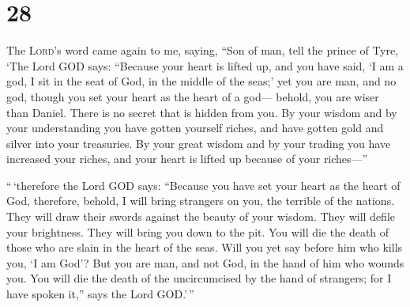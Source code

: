 \hypertarget{section-27}{%
\section{28}\label{section-27}}

 The \textsc{Lord}'s word came again to me, saying,
 ``Son of man, tell the prince of Tyre, `The Lord GOD
says: ``Because your heart is lifted up, and you have said, `I am a god,
I sit in the seat of God, in the middle of the seas;' yet you are man,
and no god, though you set your heart as the heart of a god---
 behold, you are wiser than Daniel. There is no secret
that is hidden from you.  By your wisdom and by your
understanding you have gotten yourself riches, and have gotten gold and
silver into your treasuries.  By your great wisdom and by
your trading you have increased your riches, and your heart is lifted up
because of your riches---''

 ``\,`therefore the Lord GOD says: ``Because you have set
your heart as the heart of God,  therefore, behold, I will
bring strangers on you, the terrible of the nations. They will draw
their swords against the beauty of your wisdom. They will defile your
brightness.  They will bring you down to the pit. You will
die the death of those who are slain in the heart of the seas.
 Will you yet say before him who kills you, `I am God'?
But you are man, and not God, in the hand of him who wounds you.
 You will die the death of the uncircumcised by the hand
of strangers; for I have spoken it,'' says the Lord GOD.'\,''

